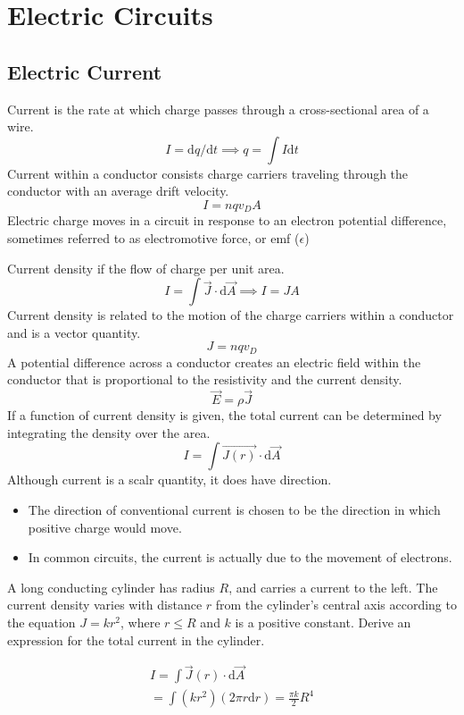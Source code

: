 \documentclass[../em.tex]{subfiles}
\begin{document}
\chapter{Electric Circuits}
\section{Electric Current}
Current is the rate at which charge passes through a cross-sectional area of a wire.
\[I=\mathrm{d}q/\mathrm{d}t \implies q = \int I \mathrm{d}t\]
Current within a conductor consists charge carriers traveling through the conductor with an average drift velocity.
\[I=nqv_D A\]
Electric charge moves in a circuit in response to an electron potential difference, sometimes referred to as electromotive force, or emf ($\epsilon$)

Current density if the flow of charge per unit area.
\[I=\int{\vec{J}\cdot\mathrm{d}\vec{A}} \implies I = JA\]
Current density is related to the motion of the charge carriers within a conductor and is a vector quantity.
\[J=nqv_D\]
A potential difference across a conductor creates an electric field within the conductor that is proportional to the resistivity and the current density.
\[\vec{E}=\rho \vec{J}\]
If a function of current density is given, the total current can be determined by integrating the density over the area.
\[I=\int \vec{J(r)}\cdot\mathrm{d}\vec{A}\]
Although current is a scalr quantity, it does have direction.
\begin{itemize}
    \item The direction of conventional current is chosen to be the direction in which positive charge would move.
    \item In common circuits, the current is actually due to the movement of electrons.
\end{itemize}

\begin{example}
    A long conducting cylinder has radius $R$, and carries a current to the left. The current density varies with distance 
    $r$ from the cylinder's central axis according to the equation $J=kr^2$, where $r\leq R$ and $k$ is a positive constant. Derive an expression
    for the total current in the cylinder.

    \begin{align*}
        I=\int\vec{J}(r)\cdot\mathrm{d}\vec{A} \\
        = \int (kr^2)(2\pi r\mathrm{d}r)
        = \frac{\pi k}{2}R^4
    \end{align*}
\end{example}
\end{document}
